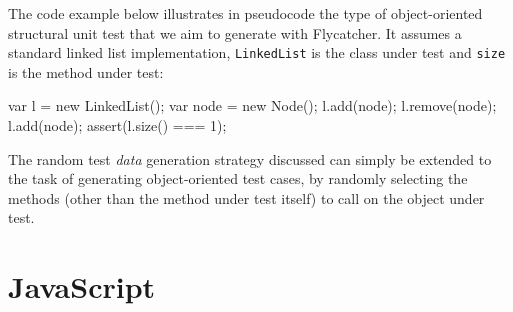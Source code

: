 
The code example below illustrates in pseudocode the type of object-oriented structural unit test that we aim to generate with \textsf{Flycatcher}. It assumes a standard linked list implementation, \texttt{LinkedList} is the class under test and \texttt{size} is the method under test:

\begin{code}[caption=Object-oriented unit test,label=backgroundexample]
var l = new LinkedList();
var node = new Node();
l.add(node);
l.remove(node);
l.add(node);
assert(l.size() === 1);
\end{code}

The random test \emph{data} generation strategy discussed can simply be extended to the task of generating object-oriented test cases, by randomly selecting the methods (other than the method under test itself) to call on the object under test.




\section{JavaScript}
\label{overalljs}

